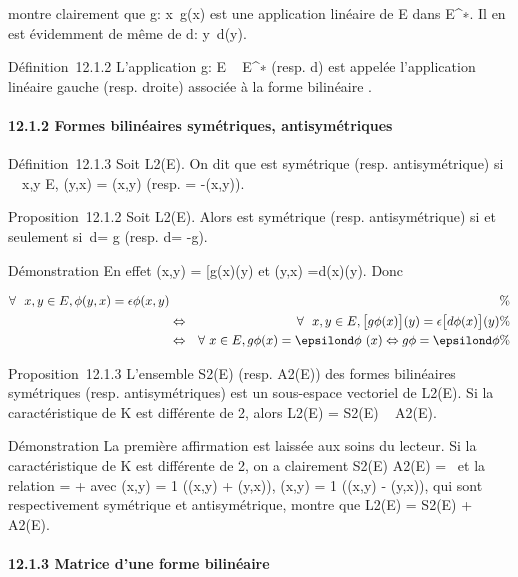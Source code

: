 montre clairement que g\phi :
x\mapsto~g\phi(x) est une application
linéaire de E dans E^∗. Il en est évidemment de même de
d\phi : y\mapsto~d\phi(y).

Définition~12.1.2 L'application g\phi : E \rightarrow~ E^∗ (resp.
d\phi) est appelée l'application linéaire gauche (resp. droite)
associée à la forme bilinéaire \phi.

\paragraph{12.1.2 Formes bilinéaires symétriques, antisymétriques}

Définition~12.1.3 Soit \phi \in L2(E). On dit que \phi est symétrique
(resp. antisymétrique) si \forall~~x,y \in E, \phi(y,x) =
\phi(x,y) (resp. = -\phi(x,y)).

Proposition~12.1.2 Soit \phi \in L2(E). Alors \phi est symétrique
(resp. antisymétrique) si et seulement si~d\phi = g\phi
(resp. d\phi = -g\phi).

Démonstration En effet \phi(x,y) =\big
{[}g\phi(x)\big {]}(y) et \phi(y,x)
=\big {[}d\phi(x)\big {]}(y). Donc

\begin{align*} \forall~~x,y \in E,
\phi(y,x) = \epsilon\phi(x,y)&& \%& \\ &
\Leftrightarrow & \forall~~x,y \in E,
\big {[}g\phi(x)\big {]}(y) =
\epsilon\big {[}d\phi(x)\big {]}(y) \%&
\\ & \Leftrightarrow &
\forall~x \in E, g\phi(x) = \epsilond\phi~(x)
\Leftrightarrow g\phi = \epsilond\phi\%&
\\ \end{align*}

Proposition~12.1.3 L'ensemble S2(E) (resp. A2(E))
des formes bilinéaires symétriques (resp. antisymétriques) est un
sous-espace vectoriel de L2(E). Si la caractéristique de K est
différente de 2, alors L2(E) = S2(E) \oplus~
A2(E).

Démonstration La première affirmation est laissée aux soins du lecteur.
Si la caractéristique de K est différente de 2, on a clairement
S2(E) \bigcap A2(E) =
\0\ et la relation \phi = \psi + \theta avec
\psi(x,y) = 1  (\phi(x,y) + \phi(y,x)), \theta(x,y) = 1
 (\phi(x,y) - \phi(y,x)), qui sont respectivement
symétrique et antisymétrique, montre que L2(E) =
S2(E) + A2(E).

\paragraph{12.1.3 Matrice d'une forme bilinéaire}

